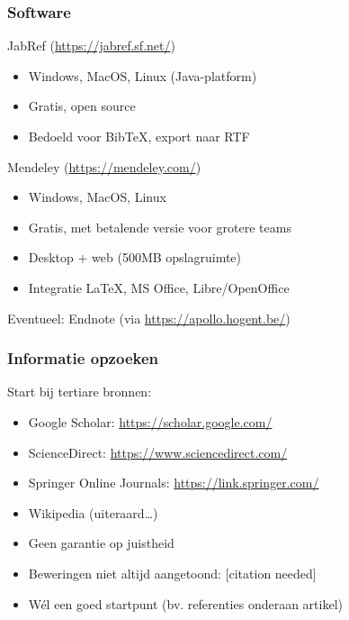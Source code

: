 \documentclass{beamer}
\begin{document}
\begin{frame}
  \frametitle{Software}

  JabRef (\url{https://jabref.sf.net/})

  \begin{itemize}
    \item Windows, MacOS, Linux (Java-platform)
    \item Gratis, open source
    \item Bedoeld voor Bib{\TeX}, export naar RTF
  \end{itemize}

  \pause

  Mendeley (\url{https://mendeley.com/})

  \begin{itemize}
    \item Windows, MacOS, Linux
    \item Gratis, met betalende versie voor grotere teams
    \item Desktop + web (500MB opslagruimte)
    \item Integratie {\LaTeX}, MS Office, Libre/OpenOffice
  \end{itemize}

  \pause

  Eventueel: Endnote (via \url{https://apollo.hogent.be/})
\end{frame}

\begin{frame}
  \frametitle{Informatie opzoeken}

  Start bij \alert{tertiare} bronnen:

  \begin{itemize}
    \item Google Scholar: \url{https://scholar.google.com/}
    \item ScienceDirect: \url{https://www.sciencedirect.com/}
    \item Springer Online Journals: \url{https://link.springer.com/}
    \item Wikipedia (uiteraard\dots)
  \end{itemize}


  \pause

  \begin{itemize}
    \item Geen garantie op juistheid
    \item Beweringen niet altijd aangetoond: [citation needed]
    \item \alert{Wél} een goed startpunt (bv. referenties onderaan artikel)
  \end{itemize}
\end{frame}
\end{document}
